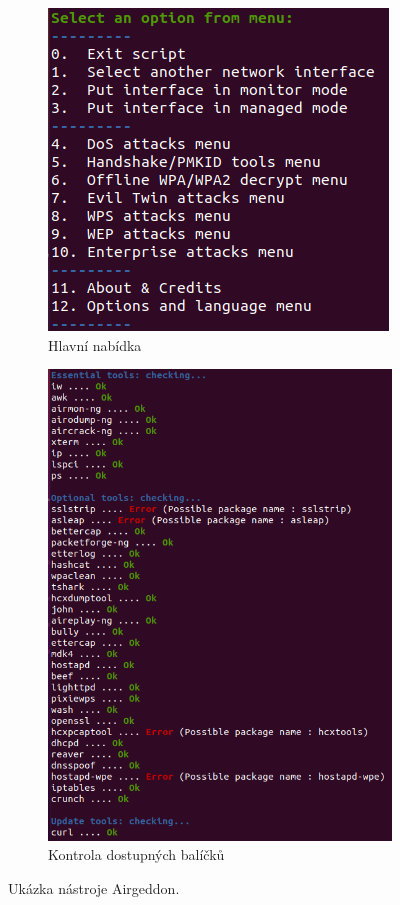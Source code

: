 \begin{figure}
\centering
\begin{subfigure}{.5\textwidth}
  \centering
  \includegraphics[width=.8\linewidth]{obrazky-figures/airgeddon-menu.png}
  \caption{Hlavní nabídka}
  \label{img:airgeddon-menu}
\end{subfigure}%
\begin{subfigure}{.5\textwidth}
  \centering
  \includegraphics[width=.9\linewidth]{obrazky-figures/airgeddon-packages.png}
  \caption{Kontrola dostupných balíčků}
  \label{img:airgeddon-packages}
\end{subfigure}
\caption{Ukázka nástroje Airgeddon.}
\label{img:airgeddon}
\end{figure}

